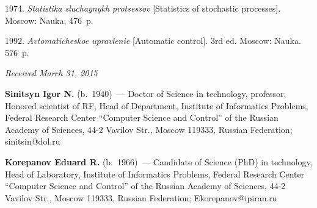 \begin{multicols}{2}
{{\begin{thebibliography}{9}
 1974. \textit{Statistika sluchaynykh protsessov} [Statistics of stochastic processes].  Moscow: Nauka,  476~p.

\vspace*{-3pt}

 1992. \textit{Avtomaticheskoe upravlenie} [Automatic control]. 3rd ed. Moscow: Nauka. 576~p.

\end{thebibliography}

 }
 }

\end{multicols}

\vspace*{-3pt}

\hfill{\small\textit{Received March 31, 2015}}



\Contr

\noindent
\textbf{Sinitsyn Igor N.} (b.\ 1940)~--- Doctor of Science in technology, professor, Honored scientist of RF, Head of Department, Institute of Informatics Problems, Federal Research Center ``Computer Science and Control'' of the Russian Academy of Sciences, 44-2 Vavilov Str., Moscow 119333, Russian Federation; sinitsin@dol.ru

\vspace*{3pt}

\noindent
\textbf{Korepanov Eduard R.} (b.\ 1966)~--- Candidate of Science (PhD) in technology, Head of Laboratory, Institute of Informatics Problems, Federal Research Center ``Computer Science and Control'' of the Russian Academy of Sciences, 44-2 Vavilov Str., Moscow 119333, Russian Federation; Ekorepanov@ipiran.ru

\label{end\stat}


\renewcommand{\bibname}{\protect\rm Литература} 
